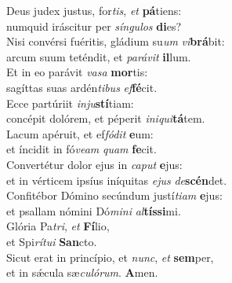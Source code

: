 \evenverse Deus judex justus, for\textit{tis}, \textit{et} \textbf{pá}tiens:~\*\\
\evenverse numquid iráscitur per \textit{sín}\textit{gu}\textit{los} \textbf{di}es?\\
\oddverse Nisi convérsi fuéritis, gládium su\textit{um} \textit{vi}\textbf{brá}bit:~\*\\
\oddverse arcum suum teténdit, et \textit{pa}\textit{rá}\textit{vit} \textbf{il}lum.\\
\evenverse Et in eo parávit \textit{va}\textit{sa} \textbf{mor}tis:~\*\\
\evenverse sagíttas suas ardén\textit{ti}\textit{bus} \textit{ef}\textbf{fé}cit.\\
\oddverse Ecce partúriit \textit{in}\textit{ju}\textbf{stí}tiam:~\*\\
\oddverse concépit dolórem, et péperit \textit{i}\textit{ni}\textit{qui}\textbf{tá}tem.\\
\evenverse Lacum apéruit, et ef\textit{fó}\textit{dit} \textbf{e}um:~\*\\
\evenverse et íncidit in fó\textit{ve}\textit{am} \textit{quam} \textbf{fe}cit.\\
\oddverse Convertétur dolor ejus in \textit{ca}\textit{put} \textbf{e}jus:~\*\\
\oddverse et in vérticem ipsíus iníquitas \textit{e}\textit{jus} \textit{de}\textbf{scén}det.\\
\evenverse Confitébor Dómino secúndum justí\textit{ti}\textit{am} \textbf{e}jus:~\*\\
\evenverse et psallam nómini Dó\textit{mi}\textit{ni} \textit{al}\textbf{tís}\textbf{si}mi.\\
\oddverse Glória Pa\textit{tri}, \textit{et} \textbf{Fí}lio,~\*\\
\oddverse et Spi\textit{rí}\textit{tu}\textit{i} \textbf{San}cto.\\
\evenverse Sicut erat in princípio, et \textit{nunc}, \textit{et} \textbf{sem}per,~\*\\
\evenverse et in sǽcula sæ\textit{cu}\textit{ló}\textit{rum}. \textbf{A}men.\\
